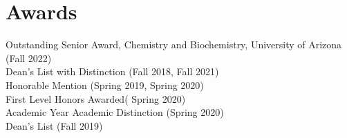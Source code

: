 \filbreak
\section{\mysidestyle Awards}
Outstanding Senior Award, Chemistry and Biochemistry, University of Arizona (Fall 2022)\\
Dean’s List with Distinction (Fall 2018, Fall 2021)\\
Honorable Mention (Spring 2019, Spring 2020)\\
First Level Honors Awarded( Spring 2020)\\
Academic Year Academic Distinction (Spring 2020)\\
Dean's List (Fall 2019)\\